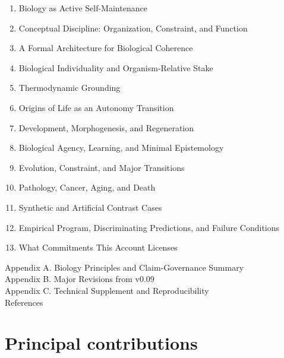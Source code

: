 \documentclass[
  11pt,
]{article}
\providecommand{\tightlist}{%
  \setlength{\itemsep}{0pt}\setlength{\parskip}{0pt}}
\begin{document}
\begin{enumerate}
\def\labelenumi{\arabic{enumi}.}
\tightlist
\item
  Biology as Active Self-Maintenance\\
\item
  Conceptual Discipline: Organization, Constraint, and Function\\
\item
  A Formal Architecture for Biological Coherence\\
\item
  Biological Individuality and Organism-Relative Stake\\
\item
  Thermodynamic Grounding\\
\item
  Origins of Life as an Autonomy Transition\\
\item
  Development, Morphogenesis, and Regeneration\\
\item
  Biological Agency, Learning, and Minimal Epistemology\\
\item
  Evolution, Constraint, and Major Transitions\\
\item
  Pathology, Cancer, Aging, and Death\\
\item
  Synthetic and Artificial Contrast Cases\\
\item
  Empirical Program, Discriminating Predictions, and Failure
  Conditions\\
\item
  What Commitments This Account Licenses
\end{enumerate}

Appendix A. Biology Principles and Claim-Governance Summary\\
Appendix B. Major Revisions from v0.09\\
Appendix C. Technical Supplement and Reproducibility\\
References

\section{Principal contributions}\label{principal-contributions}
\end{document}
